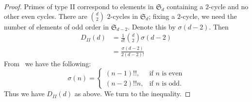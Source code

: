 \documentclass[11pt]{article}
\theoremstyle{plain}
\theoremstyle{definition}
\theoremstyle{remark}
\numberwithin{equation}{section}
\renewcommand{\SS}{\mathfrak{S}}
\begin{document}
\begin{proof}
  Primes of type II correspond to elements in $\SS_d$ containing a $2$-cycle and no other
  even cycles. There are $\binom{d}{2}$ $2$-cycles in $\SS_d$; fixing a $2$-cycle, we 
  need the number of elements of odd order in $\SS_{d-2}$. Denote this by $\sigma(d-2)$. Then
  \begin{align*}
    D_{II}(d)&=\frac{1}{d!}\binom{d}{2}\sigma(d-2)\\
             &=\frac{\sigma(d-2)}{2(d-2)!}
  \end{align*}
  From~\cite{Riordan} we have the following:
  \begin{equation*}
    \sigma(n)=\begin{cases}
        (n-1)!!,&\text{if }n\text{ is even}\\
        (n-2)!!n,&\text{if }n\text{ is odd.}
      \end{cases}
  \end{equation*}
  Thus we have $D_{II}(d)$ as above. We turn to the inequality.


\end{proof}
\end{document}
